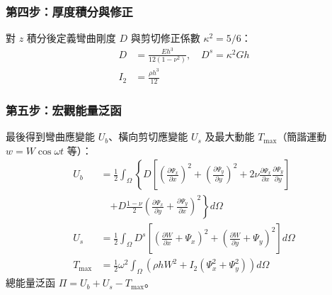 \subsubsection{第四步：厚度積分與修正}
對 $z$ 積分後定義彎曲剛度 $D$ 與剪切修正係數 $\kappa^2 = 5/6$：
\begin{align}
D &= \frac{E h^3}{12(1-\nu^2)},\quad
D^s = \kappa^2 G h \\
I_2 &= \frac{\rho h^3}{12}
\end{align}

\subsubsection{第五步：宏觀能量泛函}
最後得到彎曲應變能 $U_b$、橫向剪切應變能 $U_s$ 及最大動能 $T_{\max}$（簡諧運動 $w = W \cos\omega t$ 等）：
\begin{align}
U_b &= \frac{1}{2} \int_\Omega \left\{ D \left[ \left(\frac{\partial \Psi_x}{\partial x}\right)^2 + \left(\frac{\partial \Psi_y}{\partial y}\right)^2 + 2\nu \frac{\partial \Psi_x}{\partial x}\frac{\partial \Psi_y}{\partial y} \right] \right. \nonumber \\
&\quad \left. + D\frac{1-\nu}{2} \left( \frac{\partial \Psi_x}{\partial y} + \frac{\partial \Psi_y}{\partial x} \right)^2 \right\} d\Omega \\
U_s &= \frac{1}{2} \int_\Omega D^s \left[ \left( \frac{\partial W}{\partial x} + \Psi_x \right)^2 + \left( \frac{\partial W}{\partial y} + \Psi_y \right)^2 \right] d\Omega \\
T_{\max} &= \frac{1}{2} \omega^2 \int_\Omega \left( \rho h W^2 + I_2 (\Psi_x^2 + \Psi_y^2) \right) d\Omega
\end{align}
總能量泛函 $\Pi = U_b + U_s - T_{\max}$。

